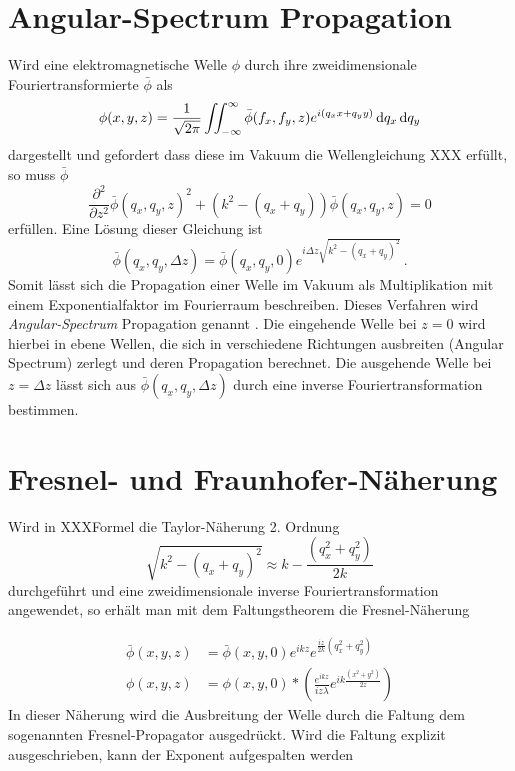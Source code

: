 \section{Angular-Spectrum Propagation}
Wird eine elektromagnetische Welle $\phi$ durch ihre zweidimensionale Fouriertransformierte $\bar{\phi}$ als
\begin{equation}
\phi(x,y,z)=\frac{1}{\sqrt{2\pi}}\iint_{-\infty}^{\infty}\bar{\phi}(f_x,f_y,z)e^{i(q_xx+q_yy)} \dif q_x \dif q_y
\end{equation}dargestellt und gefordert dass diese im Vakuum die Wellengleichung XXX erfüllt,
so muss $\bar{\phi}$
\begin{equation}
	\frac{\partial ^2}{\partial z^2}\bar{\phi}(q_x,q_y,z)^2+ \left(k^2-\left(q_x+q_y\right)\right)\bar{\phi}(q_x,q_y,z)=0
\end{equation}
erfüllen. Eine Lösung dieser Gleichung ist
\begin{equation}
\bar{\phi}\left(q_x,q_y,\Delta z\right)=\bar{\phi}(q_x,q_y,0)e^{i\Delta z\sqrt{k^2-(q_x+q_y)^2}}\, . 
\end{equation}
Somit lässt sich die Propagation einer Welle im Vakuum als Multiplikation mit einem Exponentialfaktor im Fourierraum beschreiben. Dieses Verfahren wird \textit{Angular-Spectrum} Propagation genannt \cite{goodman2005}. 
Die eingehende Welle bei $z=0$ wird hierbei in ebene Wellen, die sich in verschiedene Richtungen ausbreiten (Angular Spectrum) zerlegt und deren Propagation berechnet. Die ausgehende Welle bei $z=\Delta z$ lässt sich aus $\bar{\phi}\left(q_x,q_y,\Delta z\right)$ durch eine inverse Fouriertransformation bestimmen.



\section{Fresnel- und Fraunhofer-Näherung}
Wird in XXXFormel die Taylor-Näherung 2. Ordnung
\begin{equation}
	\sqrt{k^2-(q_x+q_y)^2}\approx k-\frac{(q_x^2+q_y^2)}{2k}
\end{equation}
durchgeführt und eine zweidimensionale inverse Fouriertransformation angewendet, so erhält man mit dem Faltungstheorem die Fresnel-Näherung 

\begin{align}
\bar{\phi}(x,y, z)&=\bar{\phi}(x,y,0) e^{ik z}e^{\frac{i z}{2k}(q_x^2+q_y^2)}\\
\phi(x,y, z)&=\phi(x,y,0) \ast \left(
\frac{e^{ik z}}{i z \lambda } 
e^{ik\frac{(x^2+y^2)}{2 z}}
\right)
\end{align}
In dieser Näherung wird die Ausbreitung der Welle durch die Faltung dem sogenannten Fresnel-Propagator ausgedrückt. Wird die Faltung explizit ausgeschrieben, kann der Exponent aufgespalten werden


